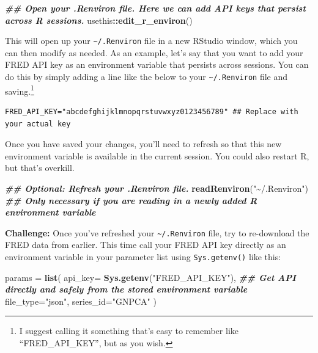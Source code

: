 \documentclass[
]{article}
\newenvironment{Shaded}{\begin{snugshade}}{\end{snugshade}}
\newcommand{\AttributeTok}[1]{\textcolor[rgb]{0.13,0.29,0.53}{#1}}
\newcommand{\DocumentationTok}[1]{\textcolor[rgb]{0.56,0.35,0.01}{\textbf{\textit{#1}}}}
\newcommand{\FunctionTok}[1]{\textcolor[rgb]{0.13,0.29,0.53}{\textbf{#1}}}
\newcommand{\NormalTok}[1]{#1}
\newcommand{\OtherTok}[1]{\textcolor[rgb]{0.56,0.35,0.01}{#1}}
\newcommand{\SpecialCharTok}[1]{\textcolor[rgb]{0.81,0.36,0.00}{\textbf{#1}}}
\newcommand{\StringTok}[1]{\textcolor[rgb]{0.31,0.60,0.02}{#1}}
\begin{document}
\begin{Shaded}
\begin{Highlighting}[]
\DocumentationTok{\#\# Open your .Renviron file. Here we can add API keys that persist across R sessions.}
\NormalTok{usethis}\SpecialCharTok{::}\FunctionTok{edit\_r\_environ}\NormalTok{() }
\end{Highlighting}
\end{Shaded}

This will open up your \texttt{\textasciitilde{}/.Renviron} file in a
new RStudio window, which you can then modify as needed. As an example,
let's say that you want to add your FRED API key as an environment
variable that persists across sessions. You can do this by simply adding
a line like the below to your \texttt{\textasciitilde{}/.Renviron} file
and saving.\footnote{I suggest calling it something that's easy to
  remember like ``FRED\_API\_KEY'', but as you wish.}

\begin{verbatim}
FRED_API_KEY="abcdefghijklmnopqrstuvwxyz0123456789" ## Replace with your actual key
\end{verbatim}

Once you have saved your changes, you'll need to refresh so that this
new environment variable is available in the current session. You could
also restart R, but that's overkill.

\begin{Shaded}
\begin{Highlighting}[]
\DocumentationTok{\#\# Optional: Refresh your .Renviron file.  }
\FunctionTok{readRenviron}\NormalTok{(}\StringTok{"\textasciitilde{}/.Renviron"}\NormalTok{) }\DocumentationTok{\#\# Only necessary if you are reading in a newly added R environment variable}
\end{Highlighting}
\end{Shaded}

\textbf{Challenge:} Once you've refreshed your
\texttt{\textasciitilde{}/.Renviron} file, try to re-download the FRED
data from earlier. This time call your FRED API key directly as an
environment variable in your parameter list using \texttt{Sys.getenv()}
like this:

\begin{Shaded}
\begin{Highlighting}[]
\NormalTok{params }\OtherTok{=} \FunctionTok{list}\NormalTok{(}
  \AttributeTok{api\_key=} \FunctionTok{Sys.getenv}\NormalTok{(}\StringTok{"FRED\_API\_KEY"}\NormalTok{), }\DocumentationTok{\#\# Get API directly and safely from the stored environment variable}
  \AttributeTok{file\_type=}\StringTok{"json"}\NormalTok{, }
  \AttributeTok{series\_id=}\StringTok{"GNPCA"}
\NormalTok{  )}
\end{Highlighting}
\end{Shaded}
\end{document}
